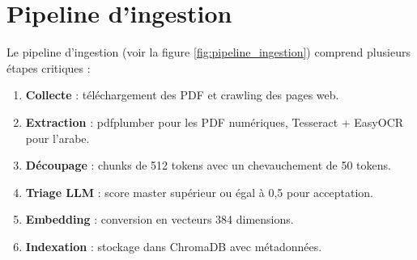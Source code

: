 \documentclass[12pt,a4paper,oneside]{report}
\begin{document}
\section{Pipeline d'ingestion}



Le pipeline d'ingestion (voir la figure \ref{fig:pipeline_ingestion}) comprend plusieurs \'{e}tapes critiques :



\begin{enumerate}[leftmargin=1.2cm]

\item \textbf{Collecte} : t\'{e}l\'{e}chargement des PDF et crawling des pages web.

\item \textbf{Extraction} : pdfplumber pour les PDF num\'{e}riques, Tesseract + EasyOCR pour l'arabe.

\item \textbf{D\'{e}coupage} : chunks de 512 tokens avec un chevauchement de 50 tokens.

\item \textbf{Triage LLM} : score master sup\'{e}rieur ou \'{e}gal \`{a} 0,5 pour acceptation.

\item \textbf{Embedding} : conversion en vecteurs 384 dimensions.

\item \textbf{Indexation} : stockage dans ChromaDB avec m\'{e}tadonn\'{e}es.

\end{enumerate}
\end{document}
